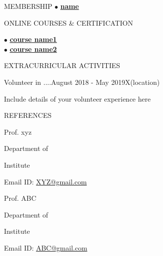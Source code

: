 \documentclass{resume}
\begin{document}
	
	\begin{rSection}{MEMBERSHIP}
		$\bullet$ \textbf {\href{web address/}{name}}
		
	\end{rSection}
	
	
	
	\begin{rSection}{ONLINE COURSES \& CERTIFICATION}
		
		$\bullet$ \textbf {\href{link1}{course name1}}\\
		$\bullet$ \textbf {\href{link2}{ course name2}}\\
		
		
	\end{rSection}						
	
	
	
	\begin{rSection}{EXTRACURRICULAR ACTIVITIES}
		
		
		\begin{rSubsection}{Volunteer in ....}{August 2018 - May 2019}{\color{white}X}{(location)}{} 
			\item Include details of your volunteer experience here
		\end{rSubsection}

		
	\end{rSection}
	
	
	\begin{rSection}{REFERENCES}
		
		\begin{rSubsection}{Prof. xyz}{}{}{} 
			\item Department of 
			\item Institute 
			\item Email ID: \href{XYZ@gmail.com}{XYZ@gmail.com}
		\end{rSubsection} 
		
		\begin{rSubsection}{Prof. ABC}{}{}{}
			\item Department of
			\item Institute 
			\item Email ID: \href{ABC@gmail.com}{ABC@gmail.com}
		\end{rSubsection}
	\end{rSection}
	
\end{document}
